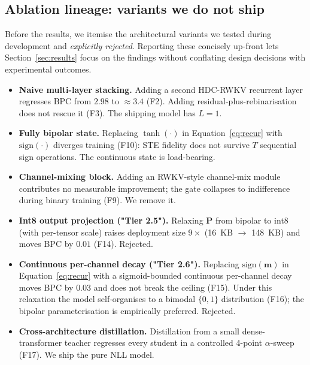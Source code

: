 \documentclass[runningheads]{llncs}
\newcommand{\bP}{\mathbf{P}}
\newcommand{\bm}{\mathbf{m}}
\begin{document}
\subsection{Ablation lineage: variants we do not ship}
\label{sec:method:lineage}

Before the results, we itemise the architectural variants we tested
during development and \emph{explicitly rejected}. Reporting these
concisely up-front lets Section~\ref{sec:results} focus on the
findings without conflating design decisions with experimental
outcomes.

\begin{itemize}
  \item \textbf{Naive multi-layer stacking.}
        Adding a second HDC-RWKV recurrent layer regresses BPC
        from $2.98$ to ${\approx}3.4$ (F2). Adding
        residual-plus-rebinarisation does not
        rescue it (F3). The shipping model has $L=1$.
  \item \textbf{Fully bipolar state.}
        Replacing $\tanh(\cdot)$ in Equation~\ref{eq:recur} with
        $\mathrm{sign}(\cdot)$ diverges training (F10): STE fidelity
        does not survive $T$ sequential sign operations. The
        continuous state is load-bearing.
  \item \textbf{Channel-mixing block.}
        Adding an RWKV-style channel-mix module contributes no
        measurable improvement; the gate collapses to indifference
        during binary training (F9). We remove it.
  \item \textbf{Int8 output projection ("Tier 2.5").}
        Relaxing $\bP$ from bipolar to int8 (with per-tensor scale)
        raises deployment size $9\times$ (16~KB $\to$ 148~KB) and
        moves BPC by $0.01$ (F14). Rejected.
  \item \textbf{Continuous per-channel decay ("Tier 2.6").}
        Replacing $\mathrm{sign}(\bm)$ in Equation~\ref{eq:recur} with
        a sigmoid-bounded continuous per-channel decay moves BPC by
        $0.03$ and does not break the ceiling (F15). Under this
        relaxation the model self-organises to a bimodal $\{0,1\}$
        distribution (F16); the bipolar parameterisation is
        empirically preferred. Rejected.
  \item \textbf{Cross-architecture distillation.}
        Distillation from a small dense-transformer teacher regresses
        every student in a controlled 4-point $\alpha$-sweep (F17).
        We ship the pure NLL model.
\end{itemize}
\end{document}
